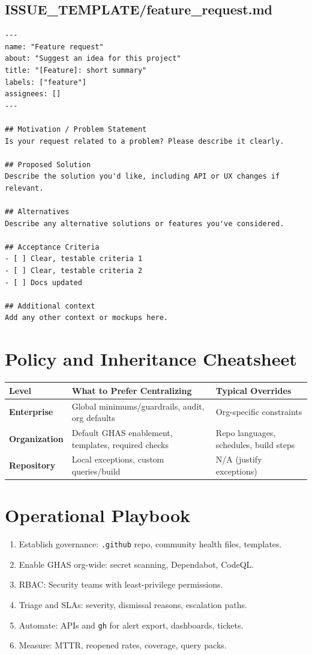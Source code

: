 \documentclass[11pt,letterpaper]{article}
\begin{document}
\subsection{ISSUE\_TEMPLATE/feature\_request.md}
\begin{verbatim}
---
name: "Feature request"
about: "Suggest an idea for this project"
title: "[Feature]: short summary"
labels: ["feature"]
assignees: []
---

## Motivation / Problem Statement
Is your request related to a problem? Please describe it clearly.

## Proposed Solution
Describe the solution you'd like, including API or UX changes if relevant.

## Alternatives
Describe any alternative solutions or features you've considered.

## Acceptance Criteria
- [ ] Clear, testable criteria 1
- [ ] Clear, testable criteria 2
- [ ] Docs updated

## Additional context
Add any other context or mockups here.
\end{verbatim}

\section{Policy and Inheritance Cheatsheet}
\begin{tabularx}{\linewidth}{>{\bfseries}l Y Y}
\hline
Level & What to Prefer Centralizing & Typical Overrides \\
\hline
Enterprise & Global minimums/guardrails, audit, org defaults & Org-specific constraints \\
Organization & Default GHAS enablement, templates, required checks & Repo languages, schedules, build steps \\
Repository & Local exceptions, custom queries/build & N/A (justify exceptions) \\
\hline
\end{tabularx}

\section{Operational Playbook}
\begin{enumerate}
  \item Establish governance: \texttt{.github} repo, community health files, templates.
  \item Enable GHAS org-wide: secret scanning, Dependabot, CodeQL.
  \item RBAC: Security teams with least-privilege permissions.
  \item Triage and SLAs: severity, dismissal reasons, escalation paths.
  \item Automate: APIs and \texttt{gh} for alert export, dashboards, tickets.
  \item Measure: MTTR, reopened rates, coverage, query packs.
\end{enumerate}
\end{document}
